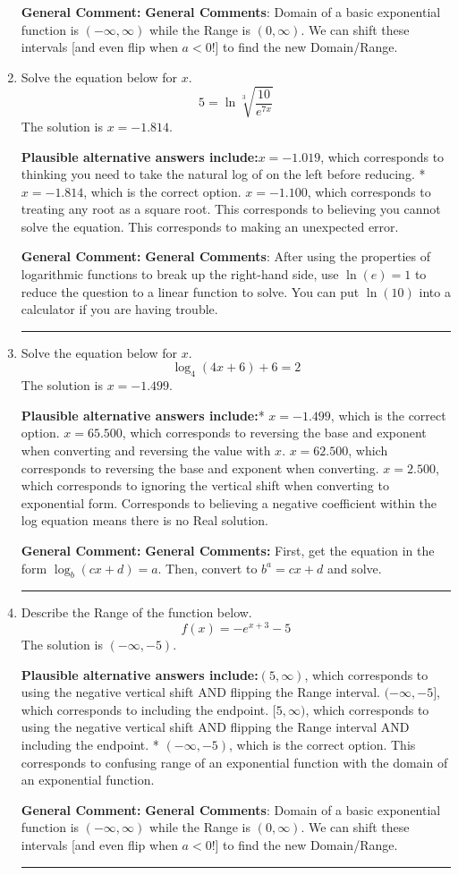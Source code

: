\documentclass{extbook}[14pt]
\newcommand{\litem}[1]{\item #1

\rule{\textwidth}{0.4pt}}
\begin{document}
\begin{enumerate}
{\textbf{General Comment:} \textbf{General Comments}: Domain of a basic exponential function is $(-\infty, \infty)$ while the Range is $(0, \infty)$. We can shift these intervals [and even flip when $a<0$!] to find the new Domain/Range.
}
\litem{
Solve the equation below for $x$.
\[  5 = \ln{\sqrt[3]{\frac{10}{e^{7x}}}} \]The solution is \( x = -1.814 \).\begin{enumerate}[label=\Alph*.]
\textbf{Plausible alternative answers include:}$x = -1.019$, which corresponds to thinking you need to take the natural log of on the left before reducing.
* $x = -1.814$, which is the correct option.
$x = -1.100$, which corresponds to treating any root as a square root.
This corresponds to believing you cannot solve the equation.
This corresponds to making an unexpected error.
\end{enumerate}

\textbf{General Comment:} \textbf{General Comments}: After using the properties of logarithmic functions to break up the right-hand side, use $\ln(e) = 1$ to reduce the question to a linear function to solve. You can put $\ln(10)$ into a calculator if you are having trouble.
}
\litem{
Solve the equation below for $x$.
\[ \log_{4}{(4x+6)}+6 = 2 \]The solution is \( x = -1.499 \).\begin{enumerate}[label=\Alph*.]
\textbf{Plausible alternative answers include:}* $x = -1.499$, which is the correct option.
$x = 65.500$, which corresponds to reversing the base and exponent when converting and reversing the value with $x$.
$x = 62.500$, which corresponds to reversing the base and exponent when converting.
$x = 2.500$, which corresponds to ignoring the vertical shift when converting to exponential form.
Corresponds to believing a negative coefficient within the log equation means there is no Real solution.
\end{enumerate}

\textbf{General Comment:} \textbf{General Comments:} First, get the equation in the form $\log_b{(cx+d)} = a$. Then, convert to $b^a = cx+d$ and solve.
}
\litem{
Describe the Range of the function below.
\[ f(x) = -e^{x+3}-5 \]The solution is \( (-\infty, -5) \).\begin{enumerate}[label=\Alph*.]
\textbf{Plausible alternative answers include:}$(5, \infty)$, which corresponds to using the negative vertical shift AND flipping the Range interval.
$(-\infty, -5]$, which corresponds to including the endpoint.
$[5, \infty)$, which corresponds to using the negative vertical shift AND flipping the Range interval AND including the endpoint.
* $(-\infty, -5)$, which is the correct option.
This corresponds to confusing range of an exponential function with the domain of an exponential function.
\end{enumerate}

\textbf{General Comment:} \textbf{General Comments}: Domain of a basic exponential function is $(-\infty, \infty)$ while the Range is $(0, \infty)$. We can shift these intervals [and even flip when $a<0$!] to find the new Domain/Range.
}
\end{enumerate}
\end{document}

